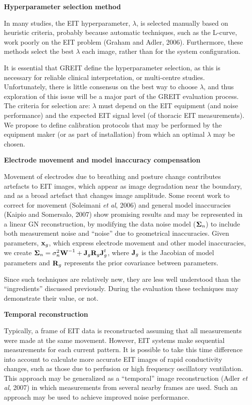 \documentclass[letterpaper,twocolumn,10pt]{article}
\newcommand{\xB}{\mbox{$\bf x$}}
\newcommand{\JB}{\mbox{$\bf J$}}
\newcommand{\RB}{\mbox{$\bf R$}}
\newcommand{\WB}{\mbox{$\bf W$}}
\newcommand{\SG}{\mbox{$\bf \Sigma$}}
\newcommand{\etal}{{\em et al}}
\begin{document}
\begin{list}{\bf {}.}
\item {\bf Hyperparameter selection method}

In many studies, the EIT hyperparameter, $\lambda$, is selected
manually based on heuristic criteria, probably because
automatic techniques, such as the L-curve, work poorly
on the EIT problem (Graham and Adler, 2006).  Furthermore,
these methods select the best $\lambda$
each image, rather than for the system configuration.

It is essential that GREIT define the hyperparameter 
selection, as this is necessary for reliable
clinical interpretation, or multi-centre studies.
Unfortunately, there is little consensus on the best
way to choose $\lambda$, and thus exploration of 
this issue will be a major part of the GREIT evaluation
process. The criteria for selection are:
$\lambda$ must depend on the EIT equipment (and noise
performance) and the expected EIT signal level (of
thoracic EIT measurements). We propose to define
calibration protocols that may be performed by the 
equipment maker (or as part of installation) from which
an optimal $\lambda$ may be chosen.

\item {\bf Electrode movement and model inaccuracy compensation}

Movement of electrodes due to breathing and posture change
contributes artefacts to EIT images, which appear as
image degradation near the boundary, and as a broad artefact
that changes image amplitude. 
Some recent work to correct for movement (Soleimani \etal, 2006)
and general model inaccuracies (Kaipio and Somersalo, 2007)
show promising results and may be represented in a linear
GN reconstruction, by modifying the data noise model
($\SG_n$) to include both measurement noise and ``noise'' 
due to geometrical inaccuracies. Given parameters, $\xB_g$,
which express electrode movement and other model inaccuracies,
we create $\SG_n = \sigma_n^2 \WB^{-1} + \JB_g \RB_g \JB_g^t$,
where $\JB_g$ is the Jacobian of model parameters and $\RB_g$
represents the prior covariance between parameters.

Since such techniques are relatively new, they are less well
understood than the ``ingredients'' discussed previously. 
During the evaluation these techniques may demonstrate
their value, or not.

\item {\bf Temporal reconstruction}

Typically, a frame of EIT data is reconstructed assuming
that all measurements were made at the same movement.
However, EIT systems make sequential measurements for
each current pattern. It is possible to take this
time difference into account to calculate more
accurate EIT images of rapid conductivity changes, such
as those due to perfusion or high frequency oscillatory
ventilation. This approach may be generalized as 
a ``temporal'' image reconstruction (Adler \etal, 2007)
in which measurements from several nearby frames are
used. Such an approach may be used to
achieve improved noise performance.

\end{list}
\end{document}
